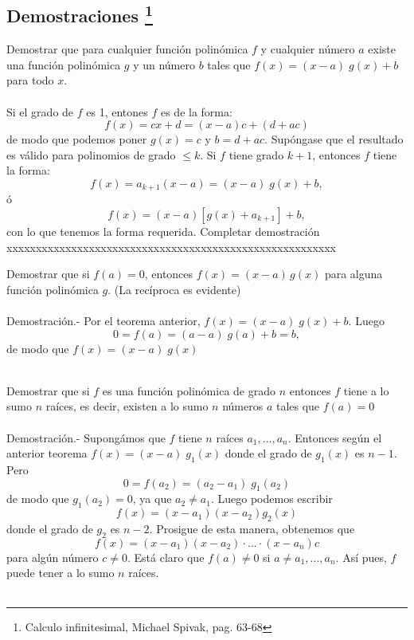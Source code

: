 \subsection[Demostraciones]{Demostraciones \footnote{Calculo infinitesimal, Michael Spivak, pag. 63-68}}
\begin{teo}
Demostrar que para cualquier función polinómica $f$ y cualquier número $a$ existe una función polinómica $g$ \; y un número $b$ tales que $f(x)=(x-a) \; g(x)+b$ para todo $x$. \\\\
Si el grado de $f$ es 1, entones $f$ es de la forma: $$f(x)=cx+d=(x-a)c + (d+ac)$$
de modo que podemos poner $g(x)=c$ \; y \;$b=d+ac$. Supóngase que el resultado es válido para polinomios de grado $\leq k.$ Si $f$ tiene grado $k+1$, entonces $f$ tiene la forma: $$f(x) = a_{k+1} (x-a) = (x-a) \; g(x) + b,$$ ó  $$f(x) = (x-a)[g(x) + a_{k+1}] + b,$$ con lo que tenemos la forma requerida.
{\color{green} Completar demostración xxxxxxxxxxxxxxxxxxxxxxxxxxxxxxxxxxxxxxxxxxxxxxxxxxxxxxxx}
\end{teo}

\begin{teo}
Demostrar que si $f(a)=0$, entonces $f(x)=(x-a)\, g(x)$ para alguna función polinómica $g$. (La recíproca es evidente)\\\\
Demostración.- \; Por el teorema anterior, $f(x)=(x-a)\; g(x) + b.$ Luego $$0=f(a)=(a-a) \; g(a) + b = b,$$
de modo que $f(x) = (x-a) \; g(x)$\\\\
\end{teo}

\begin{teo}
Demostrar que si $f$ es una función polinómica de grado $n$ entonces $f$ tiene a lo sumo $n$ raíces, es decir, existen a lo sumo $n$ números $a$ tales que $f(a)=0$\\\\
Demostración.- \; Supongámos que $f$ tiene $n$ raíces $a_1,...,a_n$. Entonces según el anterior teorema $f(x) = (x-a)\; g_1(x)$ donde el grado de $g_1(x)$ es $n-1.$ Pero $$0=f(a_2) = (a_2 - a_1) \; g_1(a_2)$$
de modo que $g_1(a_2) = 0$, ya que $a_2 \neq a_1.$ Luego podemos escribir $$f(x)=(x-a_1)(x-a_2)g_2(x)$$ donde el grado de $g_2$ es $n-2.$ Prosigue de esta manera, obtenemos que $$f(x)=(x-a_1)(x-a_2) \cdot ... \cdot (x-a_n)c$$ para algún número $c\neq 0.$ Está claro que $f(a) \neq 0$ si $a\neq a_1,..., a_n.$ Así pues, $f$ puede tener a lo sumo $n$ raíces.\\\\
\end{teo}

